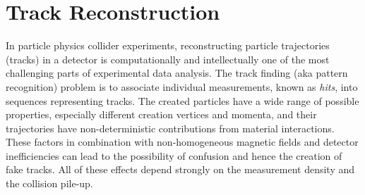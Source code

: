 
\doublespacing

\chapter{Track Reconstruction}
\label{chapter-3}




In particle physics collider experiments, reconstructing particle trajectories (tracks) in a detector is computationally and intellectually one of the most challenging parts of experimental data analysis. The track finding (aka pattern recognition) problem is to associate individual measurements, known as \textit{hits}, into sequences representing tracks. The created particles have a wide range of possible properties, especially different creation vertices and momenta, and their trajectories have non-deterministic contributions from material interactions. These factors in combination with non-homogeneous magnetic fields and detector inefficiencies can lead to the possibility of confusion and hence the creation of fake tracks. All of these effects depend strongly on the measurement density and the collision pile-up.

